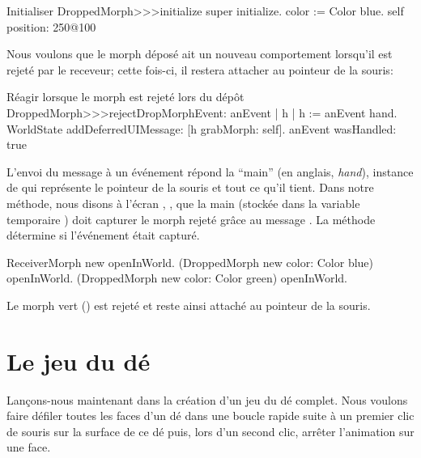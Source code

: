 \documentclass[a4paper,10pt,twoside]{book}
\begin{document}
\begin{method}{Initialiser }
DroppedMorph>>>initialize
	super initialize.
	color := Color blue.
	self position: 250@100
\end{method}

Nous voulons que le morph d\'epos\'e ait un nouveau comportement 
lorsqu'il est rejet\'e par le receveur; cette fois-ci, il restera
attacher au pointeur de la souris:
\begin{method}{R\'eagir lorsque le morph est rejet\'e lors du d\'ep\^ot}
DroppedMorph>>>rejectDropMorphEvent: anEvent
	| h |
	h := anEvent hand.
	WorldState
		addDeferredUIMessage: [h grabMorph: self].
	anEvent wasHandled: true
\end{method}

L'envoi du message  \`a un \'ev\'enement
r\'epond la ``main'' (en anglais, \emph{hand}), instance de
 qui repr\'esente le pointeur de la souris et tout ce
qu'il tient.
Dans notre m\'ethode, nous disons \`a l'\'ecran \sq, , que
la main 
(stock\'ee dans la variable temporaire ) doit capturer
le morph rejet\'e 
 gr\^ace au message .
La m\'ethode  d\'etermine si l'\'ev\'enement \'etait captur\'e.

\begin{code}{}
ReceiverMorph new openInWorld.
(DroppedMorph new color: Color blue) openInWorld.
(DroppedMorph new color: Color green) openInWorld.
\end{code}
\noindent
Le morph vert () est rejet\'e et reste ainsi attach\'e
au pointeur de la souris.

\section{Le jeu du d\'e}

Lan\c{c}ons-nous maintenant dans la cr\'eation d'un jeu
du d\'e complet. Nous voulons faire d\'efiler toutes les faces d'un
d\'e dans une boucle rapide suite \`a un premier clic de
souris sur la surface de ce d\'e puis, lors
d'un second clic, arr\^eter l'animation sur une face.
\end{document}
